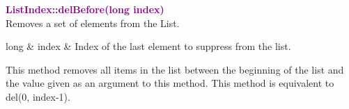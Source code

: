 \textcolor{purple}{\textbf{ListIndex::delBefore(long index)}}\label{ListIndex::delBefore(long index)}\\
Removes a set of elements from the List.

\begin{tcolorbox}[width=\textwidth,myArgs,tabularx={ll|R}]
long & index & Index of the last element to suppress from the list.
\end{tcolorbox}

This method removes all items in the list between the beginning of the list and the value given as an argument to this method.
This method is equivalent to del(0, index-1).

